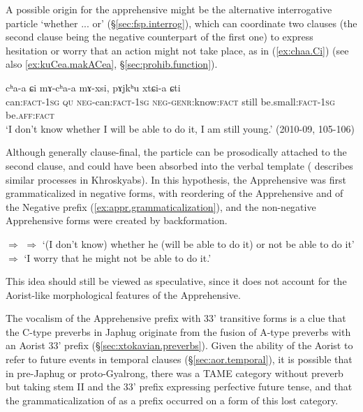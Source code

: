 A possible origin for the apprehensive  might be the alternative interrogative particle  `whether ... or' (§\ref{sec:fsp.interrog}), which can coordinate two clauses (the second clause being the negative counterpart of the first one) to express hesitation or worry that an action might not take place, as in (\ref{ex:chaa.Ci}) (see also  \ref{ex:kuCea.makACea}, §\ref{sec:prohib.function}).
 
 \begin{exe}
\ex \label{ex:chaa.Ci}
\gll  cʰa-a ɕi mɤ-cʰa-a mɤ-xsi, pɤjkʰu xtɕi-a ɕti \\
can:\textsc{fact}-\textsc{1sg} \textsc{qu} \textsc{neg}-can:\textsc{fact}-\textsc{1sg} \textsc{neg}-\textsc{genr}:know:\textsc{fact} still be.small:\textsc{fact}-\textsc{1sg} be.\textsc{aff}:\textsc{fact} \\
\glt `I don't know whether I will be able to do it, I am still young.' (2010-09, 105-106)
\end{exe}
  
Although generally clause-final, the particle    can be prosodically attached to the second clause, and could have been absorbed into the verbal template (\citealt{laiyf20betrayal} describes similar processes in Khroskyabs). In this hypothesis, the Apprehensive was first grammaticalized in negative forms, with reordering of the Apprehensive and of the Negative prefix (\ref{ex:appr.grammaticalization}), and the non-negative Apprehensive forms were created by backformation.

 \begin{exe}
\ex \label{ex:appr.grammaticalization}
\glt {} $\Rightarrow$  $\Rightarrow$  
\glt `(I don't know) whether he (will be able to do it) or not be able to do it' $\Rightarrow$ `I worry that he might not be able to do it.' 
\end{exe}

This idea should still be viewed as speculative, since it does not account for the Aorist-like morphological features of the Apprehensive. 

The  vocalism of the Apprehensive prefix with 3\fl{}3' transitive forms is a clue that the C-type preverbs in Japhug originate from the fusion of A-type  preverbs with an Aorist 3\fl{}3'  prefix (§\ref{sec:xtokavian.preverbs}). Given the ability of the Aorist to refer to future events in temporal clauses (§\ref{sec:aor.temporal}), it is possible that in pre-Japhug or proto-Gyalrong, there was a TAME category without preverb but taking stem II and the 3\fl{}3'  prefix expressing perfective future tense, and that the grammaticalization of  as a prefix occurred on a form of this lost category.

